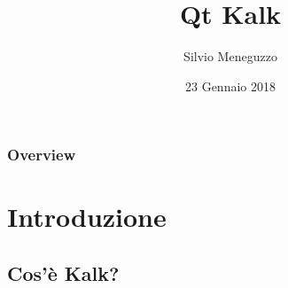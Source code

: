 \documentclass[10pt]{beamer}
\title[Space Kalc]{Qt Kalk} %
\author{Silvio Meneguzzo} %
\institute[Unipd] %
{
Università di Padova - Dipartimento di Matematica \\ %
\medskip
\textit{meneguzzosilvio@gmail.com} %
}
\date{23 Gennaio 2018} %
\begin{document}
\begin{frame}
\titlepage %
\end{frame}

\begin{frame}
\frametitle{Overview} %
\tableofcontents %
\end{frame}


\section{Introduzione} %

\subsection{Cos'è Kalk?} %
\end{document}

